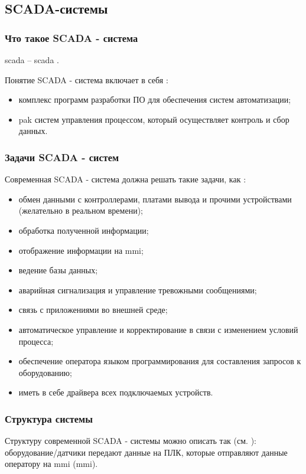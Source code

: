 \subsection{SCADA-системы}\label{par:scada}
\subsubsection{Что такое SCADA - система}
\Gls{scada} -- \glsdesc{scada} \cite{daneels_what_1999}.

Понятие SCADA - система включает в себя \cite{__2019}:
\begin{itemize}
	\item комплекс программ разработки ПО для обеспечения систем автоматизации;
	\item \Gls{pak} систем управления процессом, который осуществляет контроль и сбор данных.
\end{itemize}
\subsubsection{Задачи SCADA - систем}
Современная SCADA - система должна решать такие задачи, как \cite{daneels_what_1999, __2019, __2013-1}:
\begin{itemize}
	\item обмен данными с контроллерами, платами вывода и прочими устройствами (желательно в реальном времени);
	\item обработка полученной информации;
	\item отображение информации на \gls{mmi};
	\item ведение базы данных;
	\item аварийная сигнализация и управление тревожными сообщениями;
	\item связь с приложениями во внешней среде;
	\item автоматическое управление и корректирование в связи с изменением условий процесса;
	\item обеспечение оператора языком программирования для составления запросов к оборудованию;
	\item иметь в себе драйвера всех подключаемых устройств.
\end{itemize}
\subsubsection{Структура системы}
Структуру современной SCADA - системы можно описать так (см. ): оборудование/датчики передают данные на ПЛК, которые отправляют данные оператору на \gls{mmi} (\glsdesc{mmi}).

